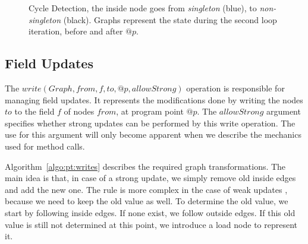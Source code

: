 \begin{figure}[h]
\begin{minipage}[tr]{0.7\linewidth}
\end{minipage}
    \caption{Cycle Detection, the inside node goes from \emph{singleton}
    (blue), to \emph{non-singleton} (black). Graphs represent the state during the
    second loop iteration, before and after $@p$.}
    \label{fig:pt:alloccycle}
\end{figure}


\subsection{Field Updates}
The $write(Graph, from, f, to, @p, allowStrong)$ operation is responsible for
managing field updates. It represents the modifications done by writing the nodes $to$ to
the field $f$ of nodes $from$, at program point $@p$. The $allowStrong$
argument specifies whether strong updates can be performed by this write
operation. The use for this argument will only become apparent when we 
describe the mechanics used for method calls.

Algorithm~\ref{algo:pt:writes} describes the required graph transformations.
The main idea is that, in case of a strong update, we simply remove old inside
edges and add the new one. The rule is more complex in the case of weak updates
, because we need to keep the old value as well. To determine the old value, we
start by following inside edges. If none exist, we follow outside edges. If
this old value is still not determined at this point, we introduce a load node
to represent it.

